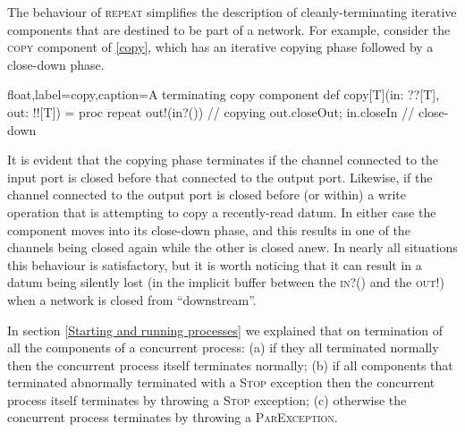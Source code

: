 \documentclass[12pt]{IOS-Book-Article-CPA-2017}
\begin{document}
The behaviour of \textsc{repeat} simplifies the description of cleanly-terminating iterative components
that are destined to be part of a network. For example, consider
the \textsc{copy} component of \Listing \ref{copy}, which has an iterative 
copying phase followed by a close-down phase.
\begin{code+}[...]{float,label=copy,caption={A terminating copy component}}
    def copy[T](in: ??[T], out: !![T]) = 
    proc {
      repeat { out!(in?()) }    // copying
      out.closeOut; in.closeIn  // close-down
    }
\end{code+}
It is evident that the copying phase terminates if the channel
connected to the input port is closed before that connected to the
output port. Likewise, if the channel connected to the output port
is closed before (or within) a write operation that is attempting
to copy a recently-read datum. In either case the component moves
into its close-down phase, and this results in one of the 
channels being closed again while the other is closed anew.
In nearly all  situations this behaviour is satisfactory, but it is
worth noticing that it can result in a datum being silently lost (in the implicit buffer between 
the \textsc{in?()} and the \textsc{out!}) when a
network is closed from ``downstream''.

In section {\ref{Starting and running processes}} we explained that
on termination of all the components of a concurrent process: 
(a) if they all terminated normally then the concurrent process 
itself terminates normally; (b) if all components that terminated abnormally
terminated with a \textsc{Stop} exception then the concurrent process 
itself terminates by throwing a \textsc{Stop} exception; (c) otherwise the concurrent process terminates 
by throwing a \textsc{ParException}.
\end{document}
